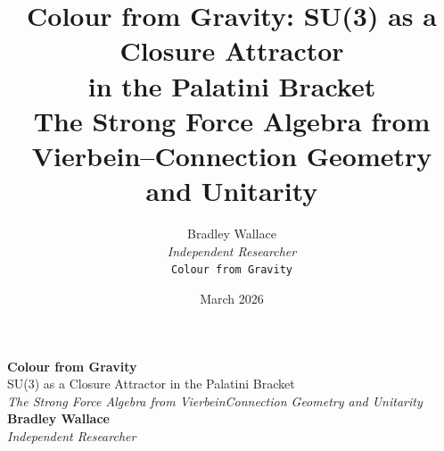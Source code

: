\documentclass[11pt,a4paper]{article}
\title{\textbf{Colour from Gravity: SU(3) as a Closure Attractor\\in the Palatini Bracket}\\[0.4em]
       \large The Strong Force Algebra from Vierbein--Connection Geometry and Unitarity}
\author{Bradley Wallace\\[0.3em]
        \small \textit{Independent Researcher}\\[0.2em]
        \small \texttt{Colour from Gravity}}
\date{March 2026}
\theoremstyle{plain}
\theoremstyle{definition}
\theoremstyle{remark}
\begin{document}
\begin{titlepage}
\thispagestyle{empty}

\noindent{\color{acsrule}\rule{\textwidth}{0.4pt}}
\vspace{6pt}
\vspace{6pt}
\noindent{\color{acsrule}\rule{\textwidth}{0.4pt}}

\vfill

\begin{center}
  {\Huge\bfseries\color{acsprimary} Colour from Gravity}\\[0.4em]
  {\Large\color{acsslate} SU(3) as a Closure Attractor in the Palatini Bracket}\\[1.2em]
  {\normalsize\itshape\color{acsslate}
    The Strong Force Algebra from Vierbein\textendash Connection Geometry and Unitarity}\\[2.0em]
  {\large\bfseries Bradley Wallace}\\[0.25em]
  {\small\itshape\color{acsslate} Independent Researcher}
\end{center}

\vspace{0.4in}


\end{titlepage}
\end{document}
